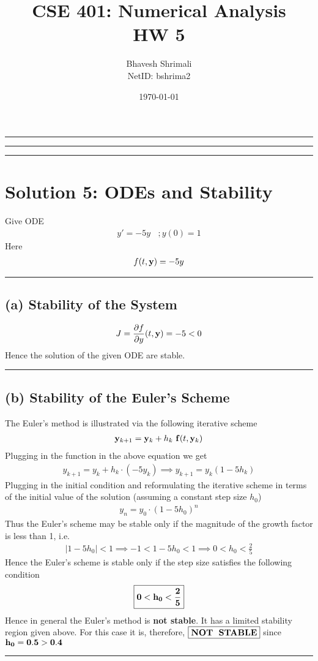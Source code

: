 
\title{\bf CSE 401: Numerical Analysis \\ HW 5}
\author{Bhavesh Shrimali \\ NetID: bshrima2}
\date{\today}
\titlespacing*{\title}{-2ex}{*-2ex}{-2ex}

\maketitle \hrule \hrule \hrule
\section*{Solution 5: ODEs and Stability}
Give ODE
\begin{align*}
y'=-5y\ \ \ \ ; y(0) = 1
\end{align*}
Here 
\begin{align*}
f(t,{\bf y}) = -5y
\end{align*}\hrule
\subsection*{(a) Stability of the System}
\begin{align*}
J = \frac{\partial {f}}{\partial {y}}(t,{\bf y})
=
-5<0
\end{align*}
Hence the solution of the given ODE are stable. \\ 
\hrule
\subsection*{(b) Stability of the Euler's Scheme }
The Euler's method is illustrated via the following iterative scheme 
\begin{align*}
{\bf y}_{k+1} = {\bf y}_k + h_k\ {\bf f}(t,{\bf y}_k)
\end{align*}
Plugging in the function in the above equation we get
\begin{align*}
{ y}_{k+1}
=
{ y}_k
+ h_k \cdot (-5y_k) \implies { y}_{k+1} = y_k (1-5h_k)
\end{align*}
Plugging in the initial condition and reformulating the iterative scheme in terms of the initial value of the solution (assuming a constant step size $h_0$)
\begin{align*}
y_n = y_0\cdot(1-5h_0)^n
\end{align*}
Thus the Euler's scheme may be stable only if the magnitude of the growth factor is less than 1, i.e.
\begin{align*}
|1-5h_0| < 1 \implies -1 < 1-5h_0 < 1 \implies 0<h_0<\frac{2}{5}
\end{align*}
Hence the Euler's scheme is stable only if the step size satisfies the following condition  
\begin{align*}
\bf\boxed{\bf
0<h_0<\frac{2}{5}
}
\end{align*}
Hence in general the Euler's method is {\bf not stable}. It has a limited stability region given above. For this case it is, therefore, $\boxed{\bf NOT\ \ STABLE}$  since $\bf h_0 = 0.5 > 0.4$ \\ \hrule
